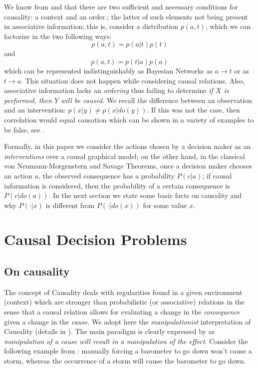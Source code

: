 \documentclass{svjour3}                     %
\begin{document}
We know from \cite{granger1969investigating} and \cite{lamport1978time} that there are two sufficient and necessary conditions for causality: a context and an order.; the latter of such elements not being present in associative information; this is, consider a distribution $p(a,t)$, which we can factorize in the two following ways:
\begin{equation}
    p(a,t)=p(a|t)p(t)
\end{equation}
and
\begin{equation}
    p(a,t)=p(t|a)p(a)
\end{equation}
which can be represented indistinguishably as Bayesian Networks as $a \to t$ or as $t \to a$. This situation does not happen while considering causal relations. Also, associative information lacks an \textit{ordering} thus failing to determine \textit{if $X$ is performed, then $Y$ will be caused}. We recall the difference between an observation and an intervention: $p(x|y) \neq p(x | do(y))$. If this was not the case, then correlation would equal causation which can be shown in a variety of examples to be false, see \cite{pearl2009causality}.

Formally, in this paper we consider the actions chosen by a decision maker as an \textit{interventions} over a causal graphical model; on the other hand, in the classical von Neumann-Morgenstern and Savage Theorems, once a decision maker chooses an action $a$, the observed consequence has a probability $P(c|a)$; if causal information is considered, then the probability of a certain consequence is $P(c|do(a))$. In the next section we state some basic facts on causality and why $P(\cdot |x)$ is different from $P(\cdot | do(x))$ for some value $x$.

\section{Causal Decision Problems}
\label{causal_decision_problems}
\subsection{On causality}
\label{on_causality}
The concept of Causality deals with regularities found in a given environment (context) which are stronger than probabilistic (or associative) relations in the sense that a causal relation allows for evaluating a change in the \textit{consequence} given a change in the \textit{cause}. We adopt here the \textit{manipulationist} interpretation of Causality (details in \cite{woodward2005making}). The main paradigm is clearly expressed by \cite{campbell1979quasi} as \textit{manipulation of a cause will result in a manipulation of the effect}. Consider the following example from \cite{woodward2005making}: manually forcing a barometer to go down won't cause a storm, whereas the occurrence of a storm will cause the barometer to go down. 
\end{document}
